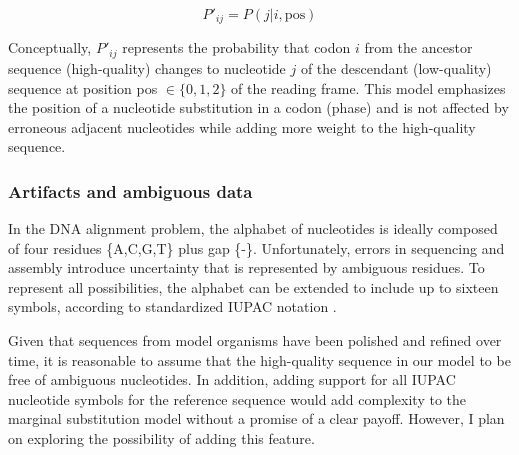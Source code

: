 \[ P'_{ij} = P(j | i, \text{pos}) \]

Conceptually, $P'_{ij}$ represents the probability that codon $i$ from the
ancestor sequence (high-quality) changes to nucleotide $j$ of the descendant
(low-quality) sequence at position pos $\in \{0,1,2\}$ of the reading frame.
This model emphasizes the position of a nucleotide substitution in a codon
(phase) and is not affected by erroneous adjacent nucleotides while adding more
weight to the high-quality sequence.


\subsubsection{Artifacts and ambiguous data}



In the DNA alignment problem, the alphabet of nucleotides is ideally composed
of four residues \{A,C,G,T\} plus gap \{-\}.
Unfortunately, errors in sequencing and assembly introduce uncertainty that is
represented by ambiguous residues.
To represent all possibilities, the alphabet can be extended to include up to
sixteen symbols, according to standardized IUPAC notation
\parencite{cornish_1985_nomenclature}.


Given that sequences from model organisms have been polished and refined over
time, it is reasonable to assume that the high-quality sequence in our model to
be free of ambiguous nucleotides.
In addition, adding support for all IUPAC nucleotide symbols for the reference
sequence would add complexity to the marginal substitution model without a
promise of a clear payoff.
However, I plan on exploring the possibility of adding this feature.

